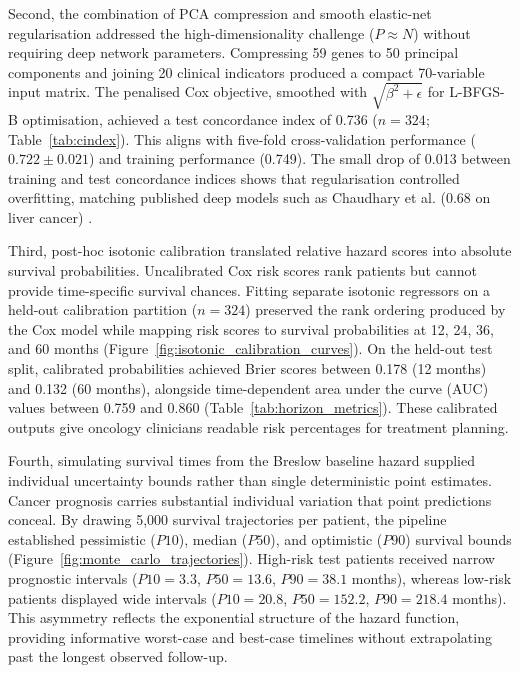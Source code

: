 \documentclass[10pt,a4paper]{article}
\begin{document}
Second, the combination of PCA compression and smooth elastic-net regularisation addressed the high-dimensionality challenge ($P \approx N$) without requiring deep network parameters. Compressing 59 genes to 50 principal components and joining 20 clinical indicators produced a compact 70-variable input matrix. The penalised Cox objective, smoothed with $\sqrt{\beta^2 + \epsilon}$ for L-BFGS-B optimisation, achieved a test concordance index of 0.736 ($n = 324$; Table~\ref{tab:cindex}). This aligns with five-fold cross-validation performance ($0.722 \pm 0.021$) and training performance (0.749). The small drop of 0.013 between training and test concordance indices shows that regularisation controlled overfitting, matching published deep models such as Chaudhary et al. (0.68 on liver cancer) \citep{chaudhary2018deep}.

Third, post-hoc isotonic calibration translated relative hazard scores into absolute survival probabilities. Uncalibrated Cox risk scores rank patients but cannot provide time-specific survival chances. Fitting separate isotonic regressors on a held-out calibration partition ($n = 324$) preserved the rank ordering produced by the Cox model while mapping risk scores to survival probabilities at 12, 24, 36, and 60 months (Figure~\ref{fig:isotonic_calibration_curves}). On the held-out test split, calibrated probabilities achieved Brier scores between 0.178 (12 months) and 0.132 (60 months), alongside time-dependent area under the curve (AUC) values between 0.759 and 0.860 (Table~\ref{tab:horizon_metrics}). These calibrated outputs give oncology clinicians readable risk percentages for treatment planning.

Fourth, simulating survival times from the Breslow baseline hazard supplied individual uncertainty bounds rather than single deterministic point estimates. Cancer prognosis carries substantial individual variation that point predictions conceal. By drawing 5,000 survival trajectories per patient, the pipeline established pessimistic ($P10$), median ($P50$), and optimistic ($P90$) survival bounds (Figure~\ref{fig:monte_carlo_trajectories}). High-risk test patients received narrow prognostic intervals ($P10 = 3.3$, $P50 = 13.6$, $P90 = 38.1$ months), whereas low-risk patients displayed wide intervals ($P10 = 20.8$, $P50 = 152.2$, $P90 = 218.4$ months). This asymmetry reflects the exponential structure of the hazard function, providing informative worst-case and best-case timelines without extrapolating past the longest observed follow-up.
\end{document}
